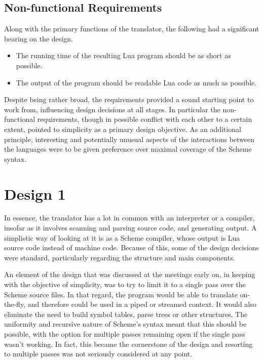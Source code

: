 \subsection{Non-functional Requirements}

Along with the primary functions of the translator, the following had a
significant bearing on the design.
\begin{itemize}
\item The running time of the resulting Lua program should be as short as
possible.
\item The output of the program should be readable Lua code as much as possible.
\end{itemize}

Despite being rather broad, the requirements provided a sound starting point to
work from, influencing design decisions at all stages. In particular the
non-functional requirements, though in possible conflict with each other to a
certain extent, pointed to simplicity as a primary design objective. As an
additional principle, interesting and potentially unusual aspects of the
interactions between the languages were to be given preference over maximal
coverage of the Scheme syntax.


\section{Design 1}

In essence, the translator has a lot in common with an interpreter or a
compiler, insofar as it involves scanning and parsing source code, and
generating output. A simplistic way of looking at it is as a Scheme compiler,
whose output is Lua source code instead of machine code. Because of this, some
of the design decisions were standard, particularly regarding the structure and
main components.

An element of the design that was discussed at the meetings early on, in keeping
with the objective of simplicity, was to try to limit it to a single pass over
the Scheme source files. In that regard, the program would be able to translate
on-the-fly, and therefore could be used in a piped or streamed context. It would
also eliminate the need to build symbol tables, parse trees or other structures.
The uniformity and recursive nature of Scheme's syntax meant that this should be
possible, with the option for multiple passes remaining open if the single pass
wasn't working. In fact, this became the cornerstone of the design and resorting
to multiple passes was not seriously considered at any point.

